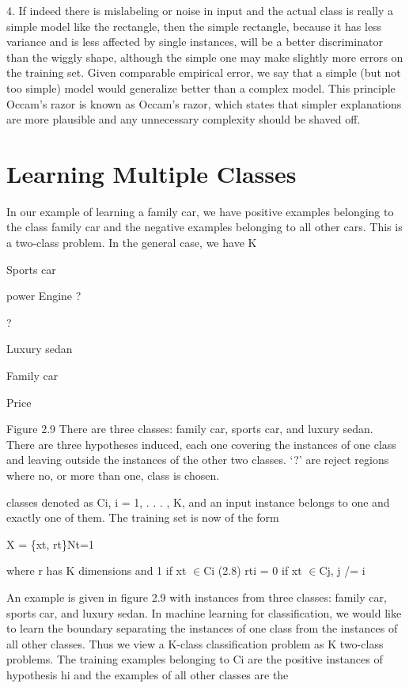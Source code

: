 4. If indeed there is mislabeling or noise in input and the actual class is really a simple model like the rectangle, then the simple rectangle, because it has less variance and is less affected by single instances, will be a better discriminator than the wiggly shape, although the simple one may make slightly more errors on the training set. Given comparable empirical error, we say that a simple (but not too simple) model would generalize better than a complex model. This principle Occam’s razor is known as Occam’s razor, which states that simpler explanations are more plausible and any unnecessary complexity should be shaved off.

\section{Learning Multiple Classes}

In our example of learning a family car, we have positive examples belonging to the class family car and the negative examples belonging to all other cars. This is a two-class problem. In the general case, we have K

Sports car

power Engine ?

?

Luxury sedan

Family car

Price

Figure 2.9 There are three classes: family car, sports car, and luxury sedan. There are three hypotheses induced, each one covering the instances of one class and leaving outside the instances of the other two classes. ‘?’ are reject regions where no, or more than one, class is chosen.

classes denoted as Ci, i = 1, . . . , K, and an input instance belongs to one and exactly one of them. The training set is now of the form

X = \{xt, rt\}Nt=1

where r has K dimensions and 1 if xt $\in$Ci (2.8) rti = 0 if xt $\in$Cj, j /= i

An example is given in figure 2.9 with instances from three classes: family car, sports car, and luxury sedan. In machine learning for classification, we would like to learn the boundary separating the instances of one class from the instances of all other classes. Thus we view a K-class classification problem as K two-class problems. The training examples belonging to Ci are the positive instances of hypothesis hi and the examples of all other classes are the

